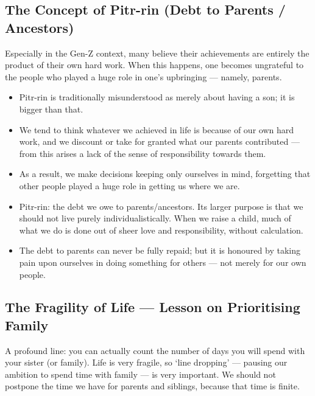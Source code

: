 \subsection{The Concept of Pitr-rin (Debt to Parents / Ancestors)}

Especially in the Gen-Z context, many believe their achievements are entirely the product of their own hard work. When this happens, one becomes ungrateful to the people who played a huge role in one's upbringing --- namely, parents.

\begin{itemize}
\item Pitr-rin is traditionally misunderstood as merely about having a son; it is bigger than that.
\item We tend to think whatever we achieved in life is because of our own hard work, and we discount or take for granted what our parents contributed --- from this arises a lack of the sense of responsibility towards them.
\item As a result, we make decisions keeping only ourselves in mind, forgetting that other people played a huge role in getting us where we are.
\end{itemize}

\begin{KeyConcept}
\begin{itemize}
\item Pitr-rin: the debt we owe to parents/ancestors. Its larger purpose is that we should not live purely individualistically. When we raise a child, much of what we do is done out of sheer love and responsibility, without calculation.
\item The debt to parents can never be fully repaid; but it is honoured by taking pain upon ourselves in doing something for others --- not merely for our own people.
\end{itemize}
\end{KeyConcept}

\subsection{The Fragility of Life --- Lesson on Prioritising Family}

A profound line: you can actually count the number of days you will spend with your sister (or family). Life is very fragile, so `line dropping' --- pausing our ambition to spend time with family --- is very important. We should not postpone the time we have for parents and siblings, because that time is finite.

